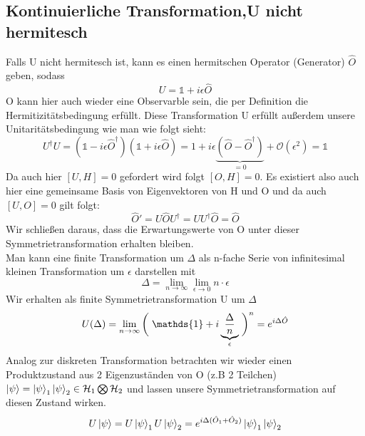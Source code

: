 \documentclass[Ex4_Zusammenfassung.tex]{subfiles}
\begin{document}
\subsection{Kontinuierliche Transformation,U nicht hermitesch}
Falls U nicht hermitesch ist, kann es einen hermitschen Operator (Generator) $\hat{O}$ geben, sodass
\begin{equation}
	U = \mathds{1} + i \epsilon \hat{O}
\end{equation}
O kann hier auch wieder eine Observarble sein, die per Definition die Hermitizitätsbedingung erfüllt. Diese Transformation U erfüllt außerdem unsere Unitaritätsbedingung wie man wie folgt sieht:
\begin{equation}
	U^{\dag} U = (\mathds{1} - i \epsilon \hat{O}^{\dag}) (\mathds{1} + i \epsilon \hat{O}) = 1 + i \epsilon \underbrace{(\hat{O} - \hat{O}^{\dag})}_{=0} + \mathcal O(\epsilon^2) = \mathds{1} 
\end{equation}
Da auch hier $[U,H]=0$ gefordert wird folgt $[O,H]=0$. Es existiert also auch hier eine gemeinsame Basis von Eigenvektoren von H und O und da auch $[U,O]=0$ gilt folgt:
\begin{equation}
	\hat{O}' = U \hat{O} U^{\dag} = U U^{\dag} \hat{O} = \hat{O}
\end{equation}
Wir schließen daraus, dass die Erwartungswerte von O unter dieser Symmetrietransformation erhalten bleiben.\\ \newline
Man kann eine finite Transformation um $\Delta$ als n-fache Serie von infinitesimal kleinen Transformation um $\epsilon$ darstellen mit
\begin{equation}
	\Delta = \lim_{n \rightarrow \infty} \lim_{\epsilon \rightarrow 0} n \cdot \epsilon
\end{equation}
Wir erhalten als finite Symmetrietransformation U um $\Delta$
\begin{equation}
	U(\Delta)= \lim_{n\rightarrow \infty} \left( \vphantom{\frac{\Delta}{n}} \right. %
	\mathds{1} + i \underbrace{\frac{\Delta}{n}}_{\epsilon}%
	\left. \vphantom{\frac{\Delta}{n}} \right)^n = e^{i\Delta \hat{O}}
\end{equation}
Analog zur diskreten Transformation betrachten wir wieder einen Produktzustand aus 2 Eigenzuständen von O (z.B 2 Teilchen) $\ket{\psi} = \ket{\psi}_1 \ket{\psi}_2 \in \mathcal{H}_1 \bigotimes \mathcal{H}_2$ und lassen unsere Symmetrietransformation auf diesen Zustand wirken.
\begin{equation}
	U \ket{\psi} = U \ket{\psi}_1 U \ket{\psi}_2 = e^{i\Delta(\hat{O}_1 + \hat{O}_2)} \ket{\psi}_1 \ket{\psi}_2
\end{equation}
\end{document}
